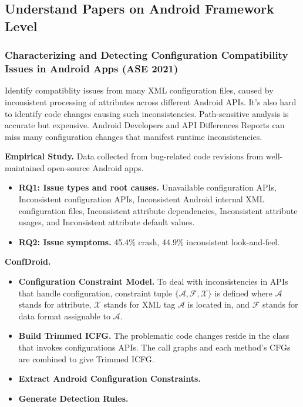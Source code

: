 \subsection{Understand Papers on Android Framework Level}
\label{task:20240211_aosp}

\subsubsection{Characterizing and Detecting Configuration Compatibility Issues in Android Apps (ASE 2021)}

Identify compatiblity issues from many XML configuration files, caused by inconsistent processing of attributes across different Android APIs. It's also hard to identify code changes causing such inconsistencies. Path-sensitive analysis is accurate but expensive. Android Developers and API Differences Reports can miss many configuration changes that manifest runtime inconsistencies.

\textbf{Empirical Study.} Data collected from bug-related code revisions from well-maintained open-source Android apps.

\begin{itemize}
    \item \textbf{RQ1: Issue types and root causes.} Unavailable configuration APIs, Inconsistent configuration APIs, Inconsistent Android internal XML configuration files, Inconsistent attribute dependencies, Inconsistent attribute usages, and Inconsistent attribute default values. 
    \item \textbf{RQ2: Issue symptoms.} 45.4\% crash, 44.9\% inconsistent look-and-feel. 
\end{itemize}

\textbf{ConfDroid.} 

\begin{itemize}
    \item \textbf{Configuration Constraint Model.} To deal with inconsistencies in APIs that handle configuration, constraint tuple $\{\mathcal{A}, \mathcal{F}, \mathcal{X}\}$ is defined where $\mathcal{A}$ stands for attribute, $\mathcal{X}$ stands for XML tag $\mathcal{A}$ is located in, and $\mathcal{F}$ stands for data format assignable to $\mathcal{A}$.
    
    \item \textbf{Build Trimmed ICFG.} The problematic code changes reside in the class that invokes configurations APIs. The call graphs and each method's CFGs are combined to give Trimmed ICFG. 

    \item \textbf{Extract Android Configuration Constraints.} 
    
    \item \textbf{Generate Detection Rules.}

\end{itemize}

